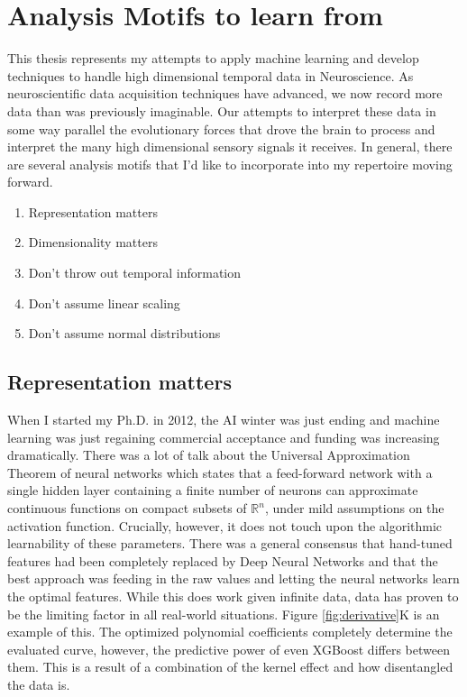 \section{Analysis Motifs to learn from}
This thesis represents my attempts to apply machine learning and develop techniques to handle high dimensional temporal data in Neuroscience. As neuroscientific data acquisition techniques have advanced, we now record more data than was previously imaginable. Our attempts to interpret these data in some way parallel the evolutionary forces that drove the brain to process and interpret the many high dimensional sensory signals it receives. In general, there are several analysis motifs that I'd like to incorporate into my repertoire moving forward.

\begin{enumerate}
    \item Representation matters
    \item Dimensionality matters
    \item Don't throw out temporal information
    \item Don't assume linear scaling
    \item Don't assume normal distributions
\end{enumerate}

\subsection{Representation matters}
When I started my Ph.D. in 2012, the AI winter was just ending and machine learning was just regaining commercial acceptance and funding was increasing dramatically. There was a lot of talk about the Universal Approximation Theorem of neural networks \cite{csaji2001approximation} which states that a feed-forward network with a single hidden layer containing a finite number of neurons can approximate continuous functions on compact subsets of $\mathbb{R}^n$, under mild assumptions on the activation function. Crucially, however, it does not touch upon the algorithmic learnability of these parameters. There was a general consensus that hand-tuned features had been completely replaced by Deep Neural Networks and that the best approach was feeding in the raw values and letting the neural networks learn the optimal features. While this does work given infinite data, data has proven to be the limiting factor in all real-world situations\cite{halevy2009unreasonable, sun2017revisiting}. Figure \ref{fig:derivative}K is an example of this. The optimized polynomial coefficients completely determine the evaluated \Thielk curve, however, the predictive power of even XGBoost differs between them. This is a result of a combination of the kernel effect and how disentangled the data is. 

